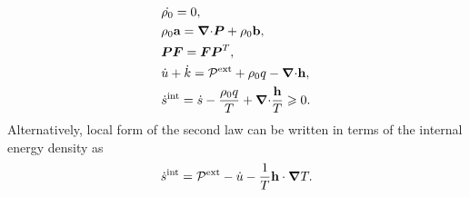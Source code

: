 \begin{subequations}
  \begin{align}
     & \dot{\rho_0} = 0,                                                                                                                \\
     & \rho_0 \textbf{a} = {\boldsymbol{\nabla} \cdot} \boldsymbol{P} + \rho_0\textbf{b},                                                                        \\
     & \boldsymbol{P}\boldsymbol{F} = \boldsymbol{F}\boldsymbol{P}^T,                                                                                                   \\
     & \dot{u} + \dot{k} = \mathcal{P}^\text{ext} + \rho_0 q - {\boldsymbol{\nabla} \cdot} \textbf{h},                                                        \\
     & \dot{s}^\text{int} = \dot{s} - \dfrac{\rho_0 q}{T} + {\boldsymbol{\nabla} \cdot} \dfrac{\textbf{h}}{T} \geqslant 0. \label{eq: dissipation inequality}
  \end{align}
\end{subequations}
Alternatively, local form of the second law can be written in terms of the internal energy density as
\begin{align}
  \dot{s}^\text{int} = \mathcal{P}^\text{ext} - \dot{u} - \dfrac{1}{T} \textbf{h} \cdot \boldsymbol{\nabla} T. \label{eq: dissipation inequality 2}
\end{align}

